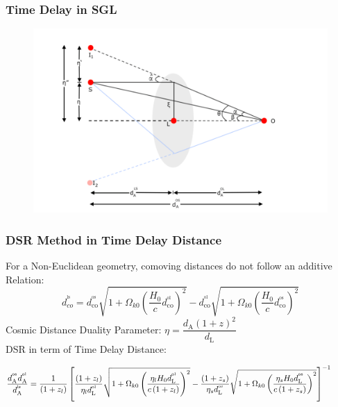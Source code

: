 \documentclass[xcolor=table,bigger]{beamer}
\begin{document}
\begin{frame}
\frametitle{Time Delay in SGL}
 \begin{figure}[ht!]
\centering
\includegraphics[width=90 mm]{sgl1}
\end{figure} 
\begin{center}
\end{center}
\end{frame}
 \begin{frame}
 \frametitle{DSR Method in Time Delay Distance}
 \vspace{3mm}
   For a Non-Euclidean geometry, comoving distances do not follow an additive Relation:
  $$
  d_{c o}^{^{\mathrm{ls}}}= d_\mathrm{c o}^{^\mathrm{os}} \sqrt{1+\Omega_{k0} \left(\dfrac{H_0}{c}d_\mathrm{c o}^\mathrm{^{ol}}\right)^{2}}-d_\mathrm{c o}^{^\mathrm{ol} }\sqrt{1+\Omega_{k0}\left(\dfrac{H_0}{c} d_\mathrm{c o}^{^\mathrm{os}}\right)^{2}}
  $$
    Cosmic Distance Duality Parameter: $\eta=\dfrac{d_\mathrm{A}(1+z)^{2}}{d_\mathrm{L}}$
  \vspace{3mm}\\
  DSR in term of Time Delay Distance:
 \vspace{1mm}\\
\begin{footnotesize}
$$
{\tiny{ \dfrac{d_\mathrm{A}^{^\mathrm{o s}} d_\mathrm{A}^{^\mathrm{o l}}}{d_\mathrm{A}^{^\mathrm{l s}}}=\dfrac{1}{\left(1+z_{l}\right)}\left[\dfrac{\left(1+z_{l}\right)}{\eta_{l} d_\mathrm{L}^{^\mathrm{o l}}} \sqrt{1+\Omega_{k0}\left(\dfrac{\eta_{l} H_{0} d_\mathrm{L}^{^\mathrm{o l}}}{c\left(1+z_{l}\right)}\right)^{2}}-\dfrac{\left(1+z_{s}\right)}{\eta_{s} d_\mathrm{L}^{^\mathrm{o s}}} \sqrt{1+\Omega_{k0}\left(\dfrac{\eta_{s} H_{0} d_\mathrm{L}^{^ \mathrm{os}}}{c\left(1+z_{s}\right)}\right)^{2}}\right]^{-1}\hspace{1cm}}}
 $$
\end{footnotesize}
\end{frame}
\end{document}
